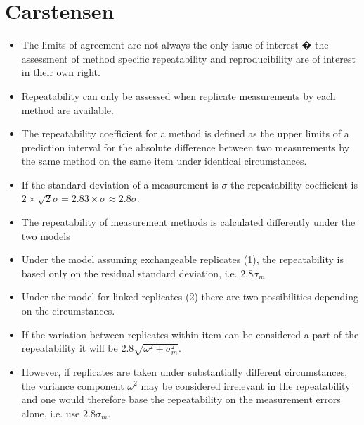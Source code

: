\documentclass[12pt, a4paper]{report}
\theoremstyle{plain}
\theoremstyle{definition}
\theoremstyle{remark}
\begin{document}
	\section{Carstensen}
	\begin{itemize}
		\item The limits of agreement are not always the only issue of
		interest � the assessment of method specific repeatability and
		reproducibility are of interest in their own right.
		
		\item Repeatability can only be assessed when replicate
		measurements by each method are available.
		
		\item The repeatability coefficient for a method is defined as the
		upper limits of a prediction interval for the absolute difference
		between two measurements by the same method on the same item under
		identical circumstances.
		
		\item If the standard deviation of a measurement is $\sigma$ the
		repeatability coefficient is $2\times\sqrt{2} \sigma = 2.83\times
		\sigma \approx 2.8 \sigma$.
		
		
		\item The repeatability of measurement methods is calculated
		differently under the two models \item Under the model assuming
		exchangeable replicates (1), the repeatability is based only on
		the residual standard deviation, i.e. $2.8\sigma_m$
		
		
		\item Under the model for linked replicates (2) there are two
		possibilities depending on the circumstances.
		
		\item If the variation between replicates within item can be
		considered a part of the repeatability it will be $2.8 \sqrt{
			\omega^2 + \sigma^2_m}$.
		
		\item However, if replicates are taken under substantially
		different circumstances, the variance component $\omega^2$ may be
		considered irrelevant in the repeatability and one would therefore
		base the repeatability on the measurement errors alone, i.e. use
		$2.8 \sigma_m$.
	\end{itemize}
	
	
	
	
\end{document}
